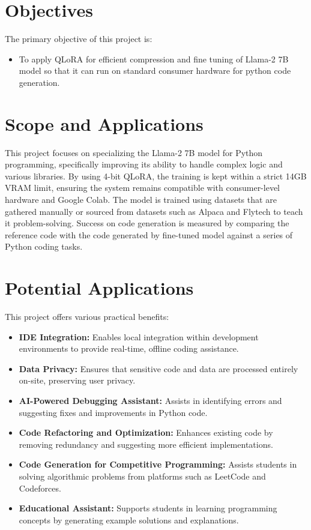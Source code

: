 \section{Objectives}
The primary objective of this project is:
\begin{itemize}
    \item To apply QLoRA for efficient compression and fine tuning of Llama-2 7B model so that it can run on standard consumer hardware for python code generation.
\end{itemize}

\section{Scope and Applications}
This project focuses on specializing the Llama-2 7B model for Python programming, specifically improving its ability to handle complex logic and various libraries. By using 4-bit QLoRA, the training is kept within a strict 14GB VRAM limit, ensuring the system remains compatible with consumer-level hardware and Google Colab. The model is trained using datasets that are gathered manually or sourced from datasets such as Alpaca and Flytech to teach it problem-solving. Success on code generation is measured by comparing the reference code with the code generated by fine-tuned model against a series of Python coding tasks.

\section*{Potential Applications}
This project offers various practical benefits:
\begin{itemize}
    \item \textbf{IDE Integration:} Enables local integration within development environments to provide real-time, offline coding assistance.
    
    \item \textbf{Data Privacy:} Ensures that sensitive code and data are processed entirely on-site, preserving user privacy.
    
    \item \textbf{AI-Powered Debugging Assistant:} Assists in identifying errors and suggesting fixes and improvements in Python code.
    
    \item \textbf{Code Refactoring and Optimization:} Enhances existing code by removing redundancy and suggesting more efficient implementations.
    
    \item \textbf{Code Generation for Competitive Programming:} Assists students in solving algorithmic problems from platforms such as LeetCode and Codeforces.

    \item \textbf{Educational Assistant:} Supports students in learning programming concepts by generating example solutions and explanations.
\end{itemize}